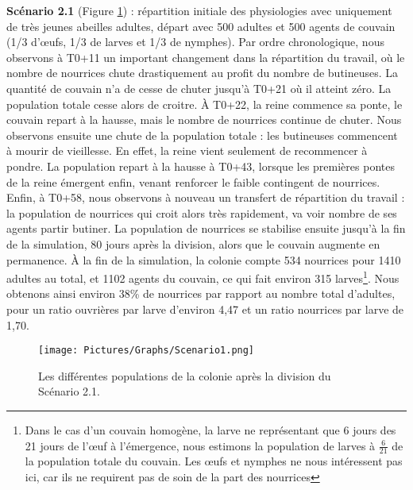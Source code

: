 		\textbf{Scénario 2.1} (Figure \ref{sc1}) : répartition initiale des physiologies avec uniquement de très jeunes abeilles adultes, départ avec 500 adultes et 500 agents de couvain (1/3 d'œufs, 1/3 de larves et 1/3 de nymphes). Par ordre chronologique, nous observons à T0+11 un important changement dans la répartition du travail, où le nombre de nourrices chute drastiquement au profit du nombre de butineuses. La quantité de couvain n'a de cesse de chuter jusqu'à T0+21 où il atteint zéro. La population totale cesse alors de croitre. À T0+22, la reine commence sa ponte, le couvain repart à la hausse, mais le nombre de nourrices continue de chuter. Nous observons ensuite une chute de la population totale : les butineuses commencent à mourir de vieillesse. En effet, la reine vient seulement de recommencer à pondre. La population repart à la hausse à T0+43, lorsque les premières pontes de la reine émergent enfin, venant renforcer le faible contingent de nourrices. Enfin, à T0+58, nous observons à nouveau un transfert de répartition du travail : la population de nourrices qui croit alors très rapidement, va voir nombre de ses agents partir butiner. La population de nourrices se stabilise ensuite jusqu'à la fin de la simulation, 80 jours après la division, alors que le couvain augmente en permanence. À la fin de la simulation, la colonie compte 534 nourrices pour 1410 adultes au total, et 1102 agents du couvain, ce qui fait environ 315 larves\footnote{\label{footCalculLarves} Dans le cas d'un couvain homogène, la larve ne représentant que 6 jours des 21 jours de l'œuf à l'émergence, nous estimons la population de larves à $\frac{6}{21}$ de la population totale du couvain. Les œufs et nymphes ne nous intéressent pas ici, car ils ne requirent pas de soin de la part des nourrices}. Nous obtenons ainsi environ 38\% de nourrices par rapport au nombre total d'adultes, pour un ratio ouvrières par larve d'environ 4,47 et un ratio nourrices par larve de 1,70.
	
	\begin{figure}
	\centering
	\texttt{[image: Pictures/Graphs/Scenario1.png]}
	\caption{Les différentes populations de la colonie après la division du Scénario 2.1.}
	\label{sc1}
	\end{figure}
		
